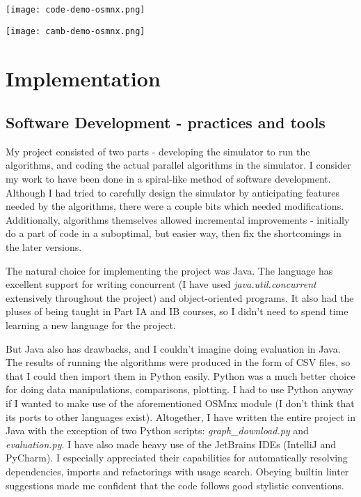 \documentclass[12pt,a4paper,twoside,openright]{report}
\begin{document}
\texttt{[image: code-demo-osmnx.png]}
\begin{center}\texttt{[image: camb-demo-osmnx.png]}\end{center}


\chapter{Implementation}

\section{Software Development - practices and tools}
My project consisted of two parts - developing the simulator to run the algorithms, and coding the actual parallel algorithms in the simulator. I consider my work to have been done in a spiral-like method of software development. Although I had tried to carefully design the simulator by anticipating features needed by the algorithms, there were a couple bits which needed modifications. Additionally, algorithms themselves allowed incremental improvements - initially do a part of code in a suboptimal, but easier way, then fix the shortcomings in the later versions.  

The natural choice for implementing the project was Java. The language has excellent support for writing concurrent (I have used \textit{java.util.concurrent} extensively throughout the project) and object-oriented programs. It also had the pluses of being taught in Part IA and IB courses, so I didn't need to spend time learning a new language for the project.

But Java also has drawbacks, and I couldn't imagine doing evaluation in Java. The results of running the algorithms were produced in the form of CSV files, so that I could then import them in Python easily. Python was a much better choice for doing data manipulations, comparisons, plotting. I had to use Python anyway if I wanted to make use of the aforementioned OSMnx module (I don't think that its ports to other languages exist). Altogether, I have written the entire project in Java with the exception of two Python scripts: \textit{graph\_download.py} and \textit{evaluation.py}. I have also made heavy use of the JetBrains IDEs (IntelliJ and PyCharm). I especially appreciated their capabilities for automatically resolving dependencies, imports and refactorings with usage search. Obeying builtin linter suggestions made me confident that the code follows good stylistic conventions.
\end{document}
